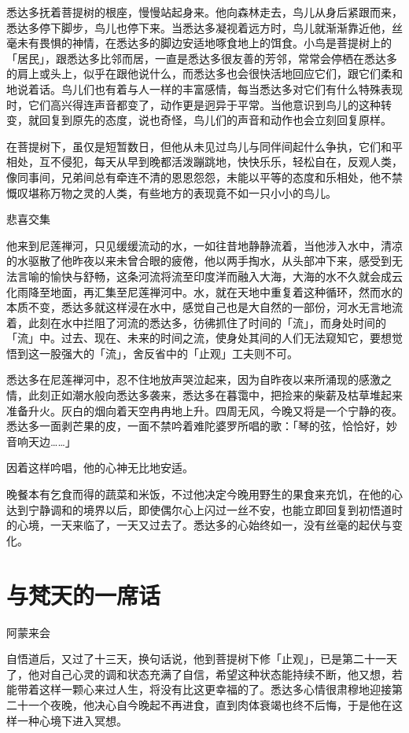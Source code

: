 \documentclass[12pt,twoside,openany]{book}
\begin{document}
悉达多抚着菩提树的根座，慢慢站起身来。他向森林走去，鸟儿从身后紧跟而来，悉达多停下脚步，鸟儿也停下来。当悉达多凝视着远方时，鸟儿就渐渐靠近他，丝毫未有畏惧的神情，在悉达多的脚边安适地啄食地上的饵食。小鸟是菩提树上的「居民」，跟悉达多比邻而居，一直是悉达多很友善的芳邻，常常会停栖在悉达多的肩上或头上，似乎在跟他说什么，而悉达多也会很快活地回应它们，跟它们柔和地说着话。鸟儿们也有着与人一样的丰富感情，每当悉达多对它们有什么特殊表现时，它们高兴得连声音都变了，动作更是迥异于平常。当他意识到鸟儿的这种转变，就回复到原先的态度，说也奇怪，鸟儿们的声音和动作也会立刻回复原样。

在菩提树下，虽仅是短暂数日，但他从未见过鸟儿与同伴间起什么争执，它们和平相处，互不侵犯，每天从早到晚都活泼蹦跳地，快快乐乐，轻松自在，反观人类，像同事间，兄弟间总有牵连不清的恩恩怨怨，未能以平等的态度和乐相处，他不禁慨叹堪称万物之灵的人类，有些地方的表现竟不如一只小小的鸟儿。

悲喜交集

他来到尼莲禅河，只见缓缓流动的水，一如往昔地静静流着，当他涉入水中，清凉的水驱散了他昨夜以来未曾合眼的疲倦，他以两手掏水，从头部冲下来，感受到无法言喻的愉快与舒畅，这条河流将流至印度洋而融入大海，大海的水不久就会成云化雨降至地面，再汇集至尼莲禅河中。水，就在天地中重复着这种循环，然而水的本质不变，悉达多就这样浸在水中，感觉自己也是大自然的一部份，河水无言地流着，此刻在水中拦阻了河流的悉达多，彷彿抓住了时间的「流」，而身处时间的「流」中。过去、现在、未来的时间之流，使身处其间的人们无法窥知它，要想觉悟到这一股强大的「流」，舍反省中的「止观」工夫则不可。

悉达多在尼莲禅河中，忍不住地放声哭泣起来，因为自昨夜以来所涌现的感激之情，此刻正如潮水般向悉达多袭来，悉达多在暮霭中，把捡来的柴薪及枯草堆起来准备升火。灰白的烟向着天空冉冉地上升。四周无风，今晚又将是一个宁静的夜。悉达多一面剥芒果的皮，一面不禁吟着难陀婆罗所唱的歌：「琴的弦，恰恰好，妙音响天边……」

因着这样吟唱，他的心神无比地安适。

晚餐本有乞食而得的蔬菜和米饭，不过他决定今晚用野生的果食来充饥，在他的心达到宁静调和的境界以后，即使偶尔心上闪过一丝不安，也能立即回复到初悟道时的心境，一天来临了，一天又过去了。悉达多的心始终如一，没有丝毫的起伏与变化。

\section{与梵天的一席话}\label{sec1.17}

阿蒙来会

自悟道后，又过了十三天，换句话说，他到菩提树下修「止观」，已是第二十一天了，他对自己心灵的调和状态充满了自信，希望这种状态能持续不断，他又想，若能带着这样一颗心来过人生，将没有比这更幸福的了。悉达多心情很肃穆地迎接第二十一个夜晚，他决心自今晚起不再进食，直到肉体衰竭也终不后悔，于是他在这样一种心境下进入冥想。
\end{document}
